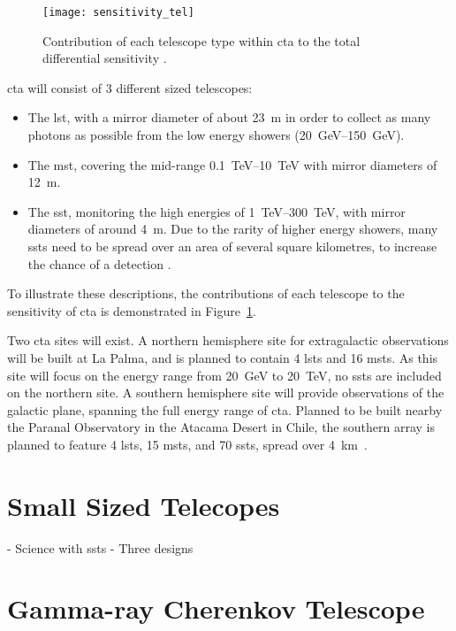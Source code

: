 \begin{figure}
	\centering\texttt{[image: sensitivity\_tel]} 
	\caption[Differential sensitivity of the different CTA telescope types.]{Contribution of each telescope type within \gls{cta} to the total differential sensitivity \cite{Marano2014}.}
	\label{fig:sensitivity_tel}
\end{figure}

\gls{cta} will consist of 3 different sized telescopes:
\begin{itemize}
\item The \gls{lst}, with a mirror diameter of about \SI{23}{m} in order to collect as many photons as possible from the low energy showers (\SIrange{20}{150}{GeV}).
\item The \gls{mst}, covering the mid-range \SIrange{0.1}{10}{TeV} with mirror diameters of \SI{12}{m}.
\item The \gls{sst}, monitoring the high energies of \SIrange{1}{300}{TeV}, with mirror diameters of around \SI{4}{m}. Due to the rarity of higher energy showers, many \glspl{sst} need to be spread over an area of several square kilometres, to increase the chance of a detection \cite{Acharya2013}.
\end{itemize}
To illustrate these descriptions, the contributions of each telescope to the sensitivity of \gls{cta} is demonstrated in Figure~\ref{fig:sensitivity_tel}.

Two \gls{cta} sites will exist. A northern hemisphere site for extragalactic observations will be built at La Palma, and is planned to contain 4 \glspl{lst} and 16 \glspl{mst}. As this site will focus on the energy range from \SI{20}{GeV} to \SI{20}{TeV}, no \glspl{sst} are included on the northern site. A southern hemisphere site will provide observations of the galactic plane, spanning the full energy range of \gls{cta}. Planned to be built nearby the Paranal Observatory in the Atacama Desert in Chile, the southern array is planned to feature 4 \glspl{lst}, 15 \glspl{mst}, and 70 \glspl{sst}, spread over \SI{4}{km \squared}.

\section{Small Sized Telecopes}

- Science with ssts
- Three designs

\section{Gamma-ray Cherenkov Telescope}

